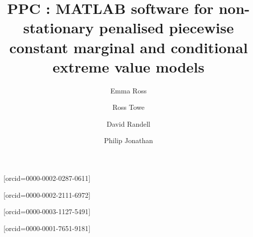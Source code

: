 \documentclass[a4paper,fleqn]{cas-sc} %
\begin{document}
\let\WriteBookmarks\relax
\def\floatpagepagefraction{1}
\def\textpagefraction{.001}

\title [mode = title]{PPC : MATLAB software for non-stationary penalised piecewise constant marginal and conditional extreme value models}


\author[shellnl]{Emma Ross}[orcid=0000-0002-0287-0611]
\address[shellnl]{Shell Global Solutions International BV, 1031 HW Amsterdam, The Netherlands.}	

\author[shelluk]{Ross Towe}[orcid=0000-0002-2111-6972]
\address[shelluk]{Shell Research Limited, London SE1 7NA, United Kingdom.}

\author[shellnl]{David Randell}[orcid=0000-0003-1127-5491]

\author[shelluk,lancs]{Philip Jonathan}[orcid=0000-0001-7651-9181]
\address[lancs]{Department of Mathematics and Statistics, Lancaster University LA1 4YF, United Kingdom.}
\cormark[1]



%
\end{document}
